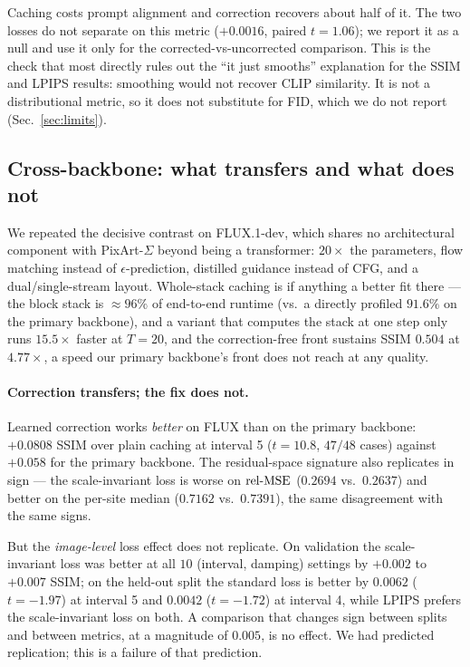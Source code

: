 Caching costs prompt alignment and correction recovers about half of it. The two
losses do not separate on this metric ($+0.0016$, paired $t{=}1.06$); we report it as a
null and use it only for the corrected-vs-uncorrected comparison. This is the check that most directly rules
out the ``it just smooths'' explanation for the SSIM and LPIPS results: smoothing
would not recover CLIP similarity. It is not a distributional metric, so it does not
substitute for FID, which we do not report (Sec.~\ref{sec:limits}).

\subsection{Cross-backbone: what transfers and what does not}
\label{sec:flux}

We repeated the decisive contrast on FLUX.1-dev, which shares no architectural
component with PixArt-$\Sigma$ beyond being a transformer: $20\times$ the parameters,
flow matching instead of $\epsilon$-prediction, distilled guidance instead of CFG,
and a dual/single-stream layout. Whole-stack caching is if anything a better fit
there --- the block stack is $\approx\!96\%$ of end-to-end runtime (vs.\ a directly profiled
$91.6\%$ on the primary backbone), and a variant that computes the stack at one step
only runs $15.5\times$ faster at $T{=}20$, and the correction-free front sustains
SSIM $0.504$ at $4.77\times$, a speed our primary backbone's front does not reach at
any quality.

\paragraph{Correction transfers; the fix does not.} Learned correction works
\emph{better} on FLUX than on the primary backbone: $+0.0808$ SSIM over plain caching
at interval 5 ($t{=}10.8$, $47/48$ cases) against $+0.058$ for the primary backbone.
The residual-space signature also replicates in sign --- the scale-invariant loss is
worse on $\mathrm{rel\text{-}MSE}$ ($0.2694$ vs.\ $0.2637$) and better on the per-site median
($0.7162$ vs.\ $0.7391$), the same disagreement with the same signs.

But the \emph{image-level} loss effect does not replicate. On validation the
scale-invariant loss was better at all $10$ (interval, damping) settings by $+0.002$
to $+0.007$ SSIM; on the held-out split the standard loss is better by $0.0062$
($t{=}-1.97$) at interval 5 and $0.0042$ ($t{=}-1.72$) at interval 4, while LPIPS
prefers the scale-invariant loss on both. A comparison that changes sign between
splits and between metrics, at a magnitude of $0.005$, is no effect. We had predicted
replication; this is a failure of that prediction.

